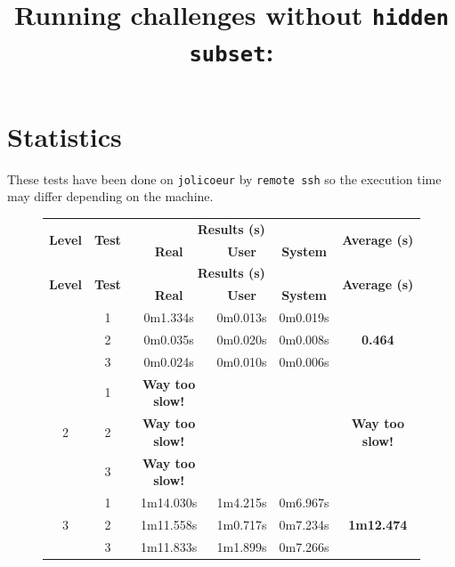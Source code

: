 \documentclass[a4paper, 11pt]{article}
\begin{document}
\newpage

\section{Statistics}
\par These tests have been done on \texttt{jolicoeur} by \texttt{remote ssh} so the execution time may differ depending on the machine.  
\title{Running challenges without \texttt{hidden subset}:}

\begin{figure}[h]
    \centering
    \begin{longtable}{|c|c|c|c|c|c|}
        \hline
        \multirow{2}{*}{\textbf{Level}} & \multirow{2}{*}{\textbf{Test}} & \multicolumn{3}{c|}{\textbf{Results (s)}} & \multirow{2}{*}{\textbf{Average (s)}} \\
        \cline{3-5}
        & & \textbf{Real} & \textbf{User} & \textbf{System} & \\
        \hline
        \endfirsthead
        \hline
        \multirow{2}{*}{\textbf{Level}} & \multirow{2}{*}{\textbf{Test}} & \multicolumn{3}{c|}{\textbf{Results (s)}} & \multirow{2}{*}{\textbf{Average (s)}} \\
        \cline{3-5}
        & & \textbf{Real} & \textbf{User} & \textbf{System} & \\
        \hline
        \endhead
        \hline
        \endfoot

        \multirow{3}{*}{1} & 1 & 0m1.334s & 0m0.013s & 0m0.019s & \multirow{3}{*}{\textbf{0.464}} \\
        \cline{2-5}
        & 2 & 0m0.035s & 0m0.020s & 0m0.008s & \\
        \cline{2-5}
        & 3 & 0m0.024s & 0m0.010s & 0m0.006s & \\
        \hline

        \multirow{3}{*}{2} & 1 & \textbf{Way too slow!} & & & \multirow{3}{*}{\textbf{Way too slow!}} \\
        \cline{2-5}
        & 2 & \textbf{Way too slow!} & & & \\
        \cline{2-5}
        & 3 & \textbf{Way too slow!} & & & \\
        \hline

        \multirow{3}{*}{3} & 1 & 1m14.030s & 1m4.215s & 0m6.967s & \multirow{3}{*}{\textbf{1m12.474}} \\
        \cline{2-5}
        & 2 & 1m11.558s & 1m0.717s & 0m7.234s & \\
        \cline{2-5}
        & 3 & 1m11.833s & 1m1.899s & 0m7.266s & \\
        \hline


\end{longtable}
\end{figure}
\end{document}

